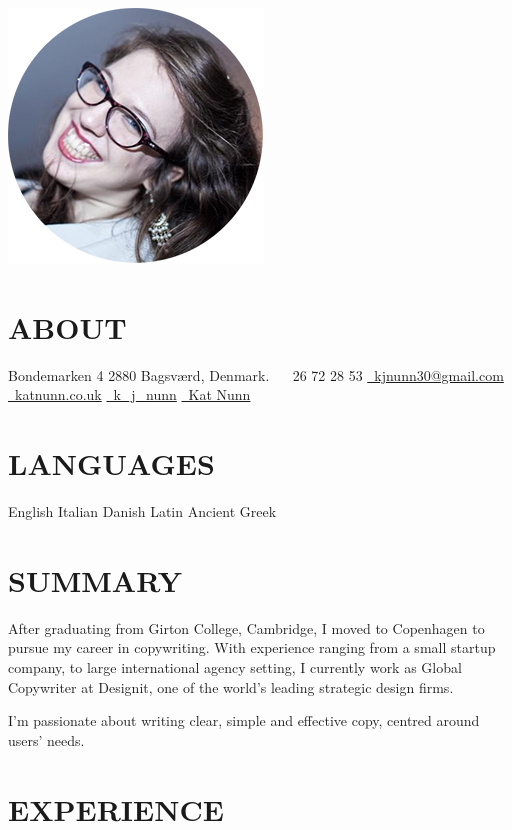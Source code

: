 \documentclass[]{friggeri-cv}
\begin{document}
       {}

\begin{aside}
  \includegraphics[width=.66\textwidth]{../img/profile.png}
  \section{ABOUT}
    Bondemarken 4
    2880 Bagsværd,
    Denmark.
    ~
	\faPhone~26 72 28 53
	\href{mailto:kjnunn30@gmail.com}{\faEnvelope~kjnunn30@gmail.com}
	\href{https://katnunn.co.uk}{\faGlobe~katnunn.co.uk}
	\href{https://twitter.com/k\_j\_nunn}{\faTwitter~k\_j\_nunn}
	\href{http://uk.linkedin.com/in/katnunn/}{\faLinkedin~Kat Nunn}
  \section{LANGUAGES}
    English
    Italian
    Danish
    Latin
    Ancient Greek
\end{aside}

\section{SUMMARY}
After graduating from Girton College, Cambridge, I moved to Copenhagen to pursue my career in copywriting. With experience ranging from a small startup company, to large international agency setting, I currently work as Global Copywriter at Designit, one of the world’s leading strategic design firms.

I’m passionate about writing clear, simple and effective copy, centred around users’ needs. 

\section{EXPERIENCE}
\end{document}
